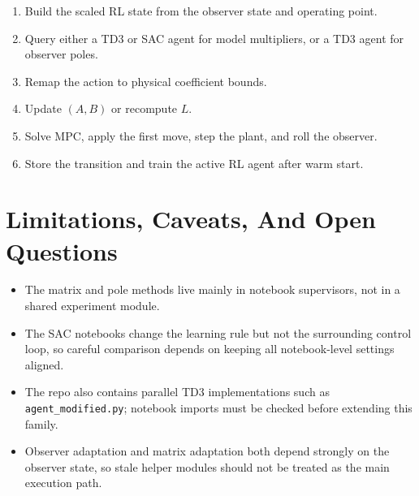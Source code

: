 \documentclass[11pt]{article}
\begin{document}
\begin{enumerate}
\item Build the scaled RL state from the observer state and operating point.
\item Query either a TD3 or SAC agent for model multipliers, or a TD3 agent for
      observer poles.
\item Remap the action to physical coefficient bounds.
\item Update $(A, B)$ or recompute $L$.
\item Solve MPC, apply the first move, step the plant, and roll the observer.
\item Store the transition and train the active RL agent after warm start.
\end{enumerate}

\section*{Limitations, Caveats, And Open Questions}

\begin{itemize}
\item The matrix and pole methods live mainly in notebook supervisors, not in a
      shared experiment module.
\item The SAC notebooks change the learning rule but not the surrounding control
      loop, so careful comparison depends on keeping all notebook-level settings
      aligned.
\item The repo also contains parallel TD3 implementations such as
      \texttt{agent\_modified.py}; notebook imports must be checked before
      extending this family.
\item Observer adaptation and matrix adaptation both depend strongly on the
      observer state, so stale helper modules should not be treated as the main
      execution path.
\end{itemize}
\end{document}
